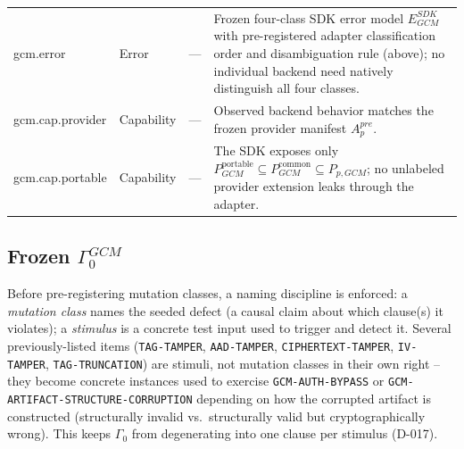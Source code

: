 \documentclass[11pt,a4paper]{article}
\begin{document}
\begin{longtable}{@{}L{0.20\textwidth}L{0.14\textwidth}L{0.19\textwidth}L{0.39\textwidth}@{}}
gcm.error & Error & --- & Frozen four-class SDK error model $E_{GCM}^{SDK}$ with pre-registered adapter classification order and disambiguation rule (above); no individual backend need natively distinguish all four classes.\\
gcm.cap.provider & Capability & --- & Observed backend behavior matches the frozen provider manifest $A_p^{pre}$.\\
gcm.cap.portable & Capability & --- & The SDK exposes only $P_{GCM}^{\text{portable}} \subseteq P_{GCM}^{\text{common}} \subseteq P_{p,GCM}$; no unlabeled provider extension leaks through the adapter.\\
\bottomrule
\end{longtable}

\subsection{Frozen \texorpdfstring{$\Gamma_0^{GCM}$}{Gamma0-GCM}}
Before pre-registering mutation classes, a naming discipline is enforced: a \emph{mutation class} names the seeded defect (a causal claim about which clause(s) it violates); a \emph{stimulus} is a concrete test input used to trigger and detect it. Several previously-listed items (\texttt{TAG-TAMPER}, \texttt{AAD-TAMPER}, \texttt{CIPHERTEXT-\allowbreak TAMPER}, \texttt{IV-TAMPER}, \texttt{TAG-TRUNCATION}) are stimuli, not mutation classes in their own right -- they become concrete instances used to exercise \texttt{GCM-AUTH-}\allowbreak\texttt{BYPASS} or \texttt{GCM-ARTIFACT-\allowbreak STRUCTURE-\allowbreak CORRUPTION} depending on how the corrupted artifact is constructed (structurally invalid vs.\ structurally valid but cryptographically wrong). This keeps $\Gamma_0$ from degenerating into one clause per stimulus (D-017).
\end{document}
